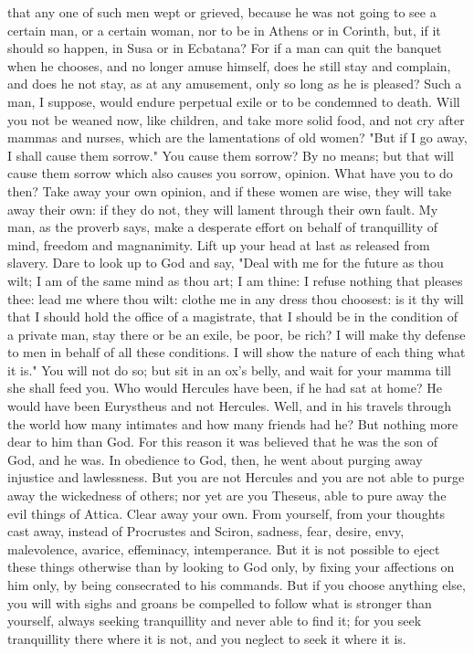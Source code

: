 \documentclass[a4paper]{article}
\begin{document}
that any one of such men wept or grieved, because he was not going to see a
certain man, or a certain woman, nor to be in Athens or in Corinth, but, if it
should so happen, in Susa or in Ecbatana? For if a man can quit the banquet
when he chooses, and no longer amuse himself, does he still stay and complain,
and does he not stay, as at any amusement, only so long as he is pleased? Such
a man, I suppose, would endure perpetual exile or to be condemned to death.
Will you not be weaned now, like children, and take more solid food, and not
cry after mammas and nurses, which are the lamentations of old women? "But if I
go away, I shall cause them sorrow." You cause them sorrow? By no means; but
that will cause them sorrow which also causes you sorrow, opinion. What have
you to do then? Take away your own opinion, and if these women are wise, they
will take away their own: if they do not, they will lament through their own
fault.
    My man, as the proverb says, make a desperate effort on behalf of
tranquillity of mind, freedom and magnanimity. Lift up your head at last as
released from slavery. Dare to look up to God and say, "Deal with me for the
future as thou wilt; I am of the same mind as thou art; I am thine: I refuse
nothing that pleases thee: lead me where thou wilt: clothe me in any dress thou
choosest: is it thy will that I should hold the office of a magistrate, that I
should be in the condition of a private man, stay there or be an exile, be
poor, be rich? I will make thy defense to men in behalf of all these
conditions. I will show the nature of each thing what it is." You will not do
so; but sit in an ox's belly, and wait for your mamma till she shall feed you.
Who would Hercules have been, if he had sat at home? He would have been
Eurystheus and not Hercules. Well, and in his travels through the world how
many intimates and how many friends had he? But nothing more dear to him than
God. For this reason it was believed that he was the son of God, and he was. In
obedience to God, then, he went about purging away injustice and lawlessness.
But you are not Hercules and you are not able to purge away the wickedness of
others; nor yet are you Theseus, able to pure away the evil things of Attica.
Clear away your own. From yourself, from your thoughts cast away, instead of
Procrustes and Sciron, sadness, fear, desire, envy, malevolence, avarice,
effeminacy, intemperance. But it is not possible to eject these things
otherwise than by looking to God only, by fixing your affections on him only,
by being consecrated to his commands. But if you choose anything else, you will
with sighs and groans be compelled to follow what is stronger than yourself,
always seeking tranquillity and never able to find it; for you seek
tranquillity there where it is not, and you neglect to seek it where it is.
\end{document}

